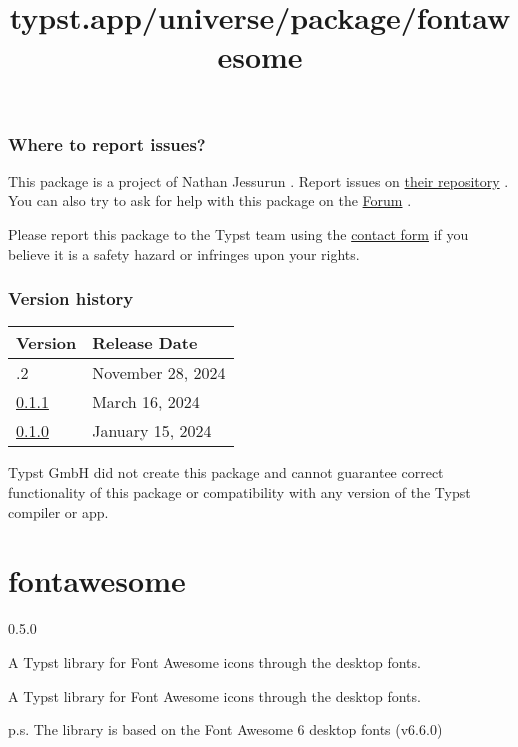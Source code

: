 \subsubsection{Where to report issues?}\label{where-to-report-issues}

This package is a project of Nathan Jessurun . Report issues on
\href{https://github.com/ntjess/showman}{their repository} . You can
also try to ask for help with this package on the
\href{https://forum.typst.app}{Forum} .

Please report this package to the Typst team using the
\href{https://typst.app/contact}{contact form} if you believe it is a
safety hazard or infringes upon your rights.

\label{versions}
\subsubsection{Version history}\label{version-history}

\begin{longtable}[]{@{}ll@{}}
\toprule\noalign{}
Version & Release Date \\
\midrule\noalign{}
\endhead
\bottomrule\noalign{}
\endlastfoot
0.1.2 & November 28, 2024 \\
\href{https://typst.app/universe/package/showman/0.1.1/}{0.1.1} & March
16, 2024 \\
\href{https://typst.app/universe/package/showman/0.1.0/}{0.1.0} &
January 15, 2024 \\
\end{longtable}

Typst GmbH did not create this package and cannot guarantee correct
functionality of this package or compatibility with any version of the
Typst compiler or app.


\title{typst.app/universe/package/fontawesome}

\label{banner}
\section{fontawesome}\label{fontawesome}

{ 0.5.0 }

A Typst library for Font Awesome icons through the desktop fonts.

\label{readme}
A Typst library for Font Awesome icons through the desktop fonts.

p.s. The library is based on the Font Awesome 6 desktop fonts (v6.6.0)

